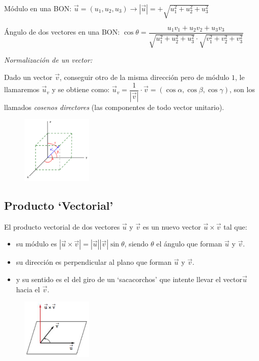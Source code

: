 \vspace{2mm} Módulo en una BON: $ \vec u=(u_1,u_2,u_3) \to |\vec u|=+\sqrt{u_1^2+u_2^2+u_3^2}$
		
\vspace{2mm} Ángulo \small{de dos vectores en una BON:} $\cos \theta = \dfrac {u_1 v_1+u_2 v_2+u_3 v_3}{\sqrt{u_1^2+u_2^2+u_3^2}\cdot \sqrt{v_1^2+v_2^2+v_3^2}}$

\vspace{4mm}

\begin{multicols}{2}
\textit{Normalización de un vector:} 

Dado un vector $\vec v$, conseguir otro de la misma dirección pero de módulo $1$, le llamaremos $\vec u_v$ y se obtiene como: $\vec u_v=\dfrac {1}{|\vec v|}\cdot \vec v = (\cos \alpha, \cos \beta, \cos \gamma)$, son los llamados \textit{cosenos directores} (las componentes de todo vector unitario).
\begin{figure}[H]
	\centering
	\includegraphics[width=0.30\textwidth]{imagenes/imagenescv/T10IM08.png}
\end{figure}
\end{multicols}

\subsection{Producto `Vectorial'}

El producto vectorial de dos vectores $\vec u$ y $\vec v$ es un nuevo vector $\vec u \times \vec v$	 tal que:
\begin{multicols}{2}
\begin{itemize}
\item su módulo es $|\vec u \times \vec v|=|\vec u||\vec v| \sin \theta $, siendo $\theta$ el ángulo que forman $\vec u$ y $\vec v$.
\item su dirección es perpendicular al plano que forman $\vec u$ y $\vec v$.
\item y su sentido es el del giro de un `sacacorchos' que intente llevar el vector$\vec u$ hacia el $\vec v$.
\end{itemize}
\begin{figure}[H]
	\centering
	\includegraphics[width=0.30\textwidth]{imagenes/imagenescv/T10IM09.png}
\end{figure}
\end{multicols}

